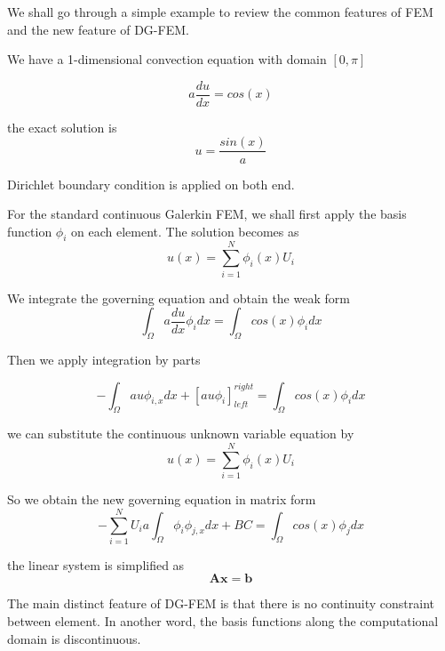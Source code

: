 We shall go through a simple example to review the common features of FEM and the new feature of DG-FEM.

We have a 1-dimensional convection equation with domain $ [0, \pi] $

\begin{equation}
a \frac{du}{dx} = cos(x)
\end{equation}

the exact solution is
\begin{equation}
u = \frac{sin(x)}{a}
\end{equation}

Dirichlet boundary condition is applied on both end.

For the standard continuous Galerkin FEM, we shall first apply the basis function $ \phi_{i} $ on each element. The solution becomes as
\begin{equation}
u(x) = \sum_{i = 1}^{N} \phi_{i} (x) U_{i}
\end{equation}

We integrate the governing equation and obtain the weak form
\begin{equation}
\int_{\Omega} a \frac{du}{dx} \phi_{i} dx = \int_{\Omega} cos(x) \phi_i dx
\end{equation}

Then we apply integration by parts

\begin{equation}
-\int_{\Omega} a u \phi_{i, x} dx + [a u \phi_{i}]^{right}_{left} = \int_{\Omega} cos(x) \phi_{i} dx
\end{equation}

we can substitute the continuous unknown variable equation by 
\begin{equation}
u(x) = \sum_{i = 1}^{N} \phi_{i}(x) U_{i}
\end{equation}

So we obtain the new governing equation in matrix form
\begin{equation}
-\sum_{i = 1}^{N} U_{i} a \int_{\Omega} \phi_{i}\phi_{j,x} dx + BC = \int_{\Omega} cos(x) \phi_{j} dx
\end{equation}

the linear system is simplified as
\begin{equation}
\mathbf{A} \mathbf{x} = \mathbf{b}
\end{equation}

The main distinct feature of DG-FEM is that there is no continuity constraint between element. In another word, the basis functions along the computational domain is discontinuous.

